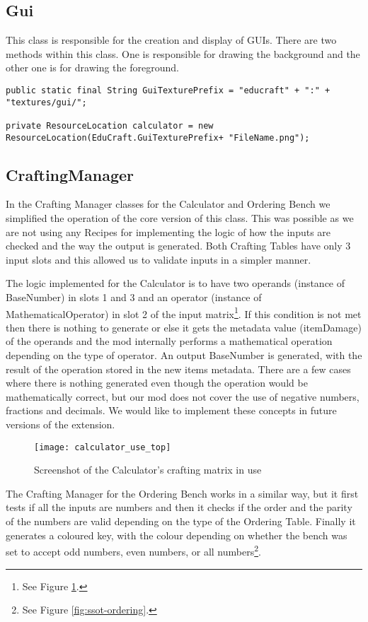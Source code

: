 \subsection{Gui}
This class is responsible for the creation and display of GUIs.
There are two methods within this class. One is responsible for drawing the background and the other one is for drawing the foreground.

\begin{lstlisting}
public static final String GuiTexturePrefix = "educraft" + ":" + "textures/gui/";

private ResourceLocation calculator = new ResourceLocation(EduCraft.GuiTexturePrefix+ "FileName.png");
\end{lstlisting}

\subsection{CraftingManager}
In the Crafting Manager classes for the Calculator and Ordering Bench we simplified the operation of the core version of this class. This was possible as we are not using any Recipes for implementing the logic of how the inputs are checked and the way the output is generated. Both Crafting Tables have only 3 input slots and this allowed us to validate inputs in a simpler manner.

The logic implemented for the Calculator is to have two operands (instance of BaseNumber) in slots 1 and 3 and an operator (instance of MathematicalOperator) in slot 2 of the input matrix\footnote{See Figure \ref{fig:ssot-calculator}.}.
If this condition is not met then there is nothing to generate or else it gets the metadata value (itemDamage) of the operands and the mod internally performs a mathematical operation depending on the type of operator. An output BaseNumber is generated, with the result of the operation stored in the new items metadata. There are a few cases where there is nothing generated even though the operation would be mathematically correct, but our mod does not cover the use of negative numbers, fractions and decimals. We would like to implement these concepts in future versions of the extension.

\begin{figure}[H]
\label{fig:ssot-calculator}
\caption{Screenshot of the Calculator's crafting matrix in use}
\centering
\texttt{[image: calculator\_use\_top]}
\end{figure}

The Crafting Manager for the Ordering Bench works in a similar way, but it first tests if all the inputs are numbers and then it checks if the order and the parity of the numbers are valid depending on the type of the Ordering Table.
Finally it generates a coloured key, with the colour depending on whether the bench was set to accept odd numbers,
even numbers, or all numbers\footnote{See Figure \ref{fig:ssot-ordering}.}.

